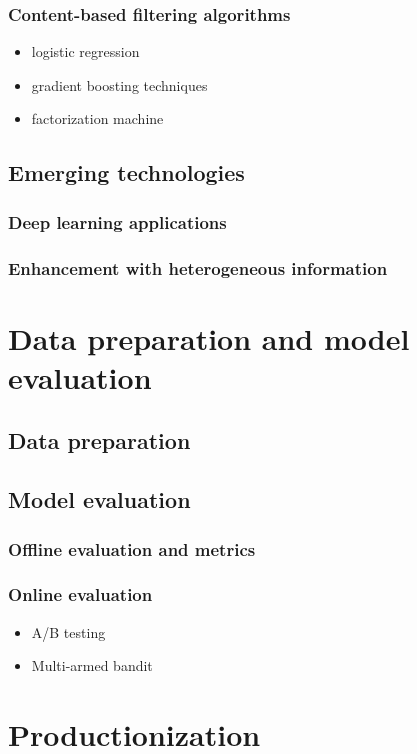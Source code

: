 \documentclass[twoside,11pt]{article}
\begin{document}
\begin{enumerate}
\begin{itemize}
\subsubsection{Content-based filtering algorithms}
\begin{itemize}
  \item logistic regression
  \item gradient boosting techniques
  \item factorization machine
\end{itemize}
\subsection{Emerging technologies}
\subsubsection{Deep learning applications}
\subsubsection{Enhancement with heterogeneous information}

\section{Data preparation and model evaluation}
\subsection{Data preparation}
\subsection{Model evaluation}
\subsubsection{Offline evaluation and metrics}
\subsubsection{Online evaluation}
\begin{itemize}
  \item A/B testing
  \item Multi-armed bandit
\end{itemize}

\section{Productionization}

\end{itemize}
\end{enumerate}
\end{document}
